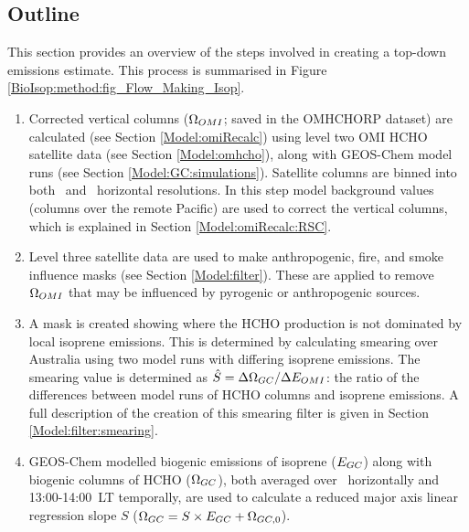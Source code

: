   \subsection{Outline}
    \label{BioIsop:method:outline}
    This section provides an overview of the steps involved in creating a top-down emissions estimate. %
    This process is summarised in Figure \ref{BioIsop:method:fig_Flow_Making_Isop}.
    \begin{enumerate}
      \item 
        Corrected vertical columns ($\Omega_{OMI}$; saved in the OMHCHORP dataset) are calculated (see Section \ref{Model:omiRecalc}) using level two OMI HCHO satellite data (see Section \ref{Model:omhcho}), along with GEOS-Chem model runs (see Section \ref{Model:GC:simulations}).
        Satellite columns are binned into both \highhr ~and \lowhr ~horizontal resolutions.
        In this step model background values (columns over the remote Pacific) are used to correct the vertical columns, which is explained in Section \ref{Model:omiRecalc:RSC}.
      \item 
        Level three satellite data are used to make anthropogenic, fire, and smoke influence masks (see Section \ref{Model:filter}).
        These are applied to remove $\Omega_{OMI}$ that may be influenced by pyrogenic or anthropogenic sources. 
      \item
        A mask is created showing where the HCHO production is not dominated by local isoprene emissions. 
        This is determined by calculating smearing over Australia using two model runs with differing isoprene emissions.
        The smearing value is determined as $\hat{S}=\Delta \Omega_{GC}/ \Delta E_{OMI}$: the ratio of the differences between model runs of HCHO columns and isoprene emissions.
        A full description of the creation of this smearing filter is given in Section \ref{Model:filter:smearing}.
      \item 
        GEOS-Chem modelled biogenic emissions of isoprene ($E_{GC}$) along with biogenic columns of HCHO ($\Omega_{GC}$), both averaged over \lowhr ~horizontally and 13:00-14:00~LT temporally, are used to calculate a reduced major axis linear regression slope $S$ ($\Omega_{GC}=S \times E_{GC} + \Omega_{GC,0}$).

\end{enumerate}
